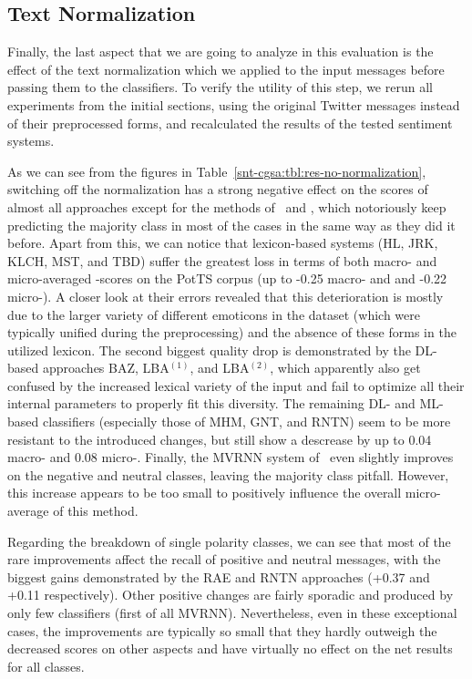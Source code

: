 \subsection{Text Normalization}

Finally, the last aspect that we are going to analyze in this
evaluation is the effect of the text normalization which we applied to
the input messages before passing them to the classifiers.  To verify
the utility of this step, we rerun all experiments from the initial
sections, using the original Twitter messages instead of their
preprocessed forms, and recalculated the results of the tested
sentiment systems.

As we can see from the figures in
Table~\ref{snt-cgsa:tbl:res-no-normalization}, switching off the
normalization has a strong negative effect on the scores of almost all
approaches except for the methods of~\citet{Yessenalina:10} and
\citet{Socher:12,Socher:13}, which notoriously keep predicting the
majority class in most of the cases in the same way as they did it
before.  Apart from this, we can notice that lexicon-based systems
(HL, JRK, KLCH, MST, and TBD) suffer the greatest loss in terms of
both macro- and micro-averaged \F{}-scores on the PotTS corpus (up to
-0.25 macro- and and -0.22 micro-\F{}).  A closer look at their errors
revealed that this deterioration is mostly due to the larger variety
of different emoticons in the dataset (which were typically unified
during the preprocessing) and the absence of these forms in the
utilized lexicon.  The second biggest quality drop is demonstrated by
the DL-based approaches BAZ, LBA$^{(1)}$, and LBA$^{(2)}$, which
apparently also get confused by the increased lexical variety of the
input and fail to optimize all their internal parameters to properly
fit this diversity.  The remaining DL- and ML-based classifiers
(especially those of MHM, GNT, and RNTN) seem to be more resistant to
the introduced changes, but still show a descrease by up to 0.04
macro- and 0.08 micro-\F{}.  Finally, the MVRNN system
of~\citet{Socher:12} even slightly improves on the negative and
neutral classes, leaving the majority class pitfall.  However, this
increase appears to be too small to positively influence the overall
micro-average of this method.

Regarding the breakdown of single polarity classes, we can see that
most of the rare improvements affect the recall of positive and
neutral messages, with the biggest gains demonstrated by the RAE and
RNTN approaches (+0.37 and +0.11 respectively).  Other positive
changes are fairly sporadic and produced by only few classifiers
(first of all MVRNN).  Nevertheless, even in these exceptional cases,
the improvements are typically so small that they hardly outweigh the
decreased scores on other aspects and have virtually no effect on the
net results for all classes.

